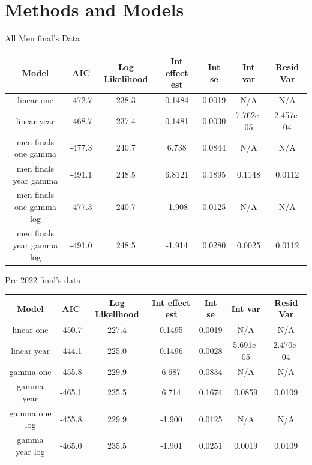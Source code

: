 \documentclass[12pt, letterpaper, titlepage]{article}
\begin{document}
\section{Methods and Models}
\label{sec:methods}


All Men final's Data
\begin{center}
  \begin{tabular}{|c | c | c | c | c | c | c |} 
   \hline\hline
   Model & AIC & Log Likelihood & Int effect est & Int se & Int var & Resid Var \\ [0.5ex] 
   \hline
   linear one & -472.7 & 238.3 & 0.1484 & 0.0019 & N/A & N/A \\ 
   \hline
   linear year & -468.7 & 237.4 & 0.1481 & 0.0030 & 7.762e-05 & 2.457e-04 \\
   \hline
   men finals one gamma & -477.3 & 240.7 & 6.738 & 0.0844 & N/A & N/A \\
   \hline
   men finals year gamma & -491.1 & 248.5 & 6.8121 & 0.1895 & 0.1148 & 0.0112 \\
   \hline
   men finals one gamma log & -477.3 & 240.7 & -1.908 & 0.0125 & N/A & N/A \\
   \hline
   men finals year gamma log & -491.0 & 248.5 & -1.914 & 0.0280 & 0.0025 & 0.0112 \\ [0.5ex]
   \hline
  \end{tabular}
\end{center}

Pre-2022 final's data
\begin{center}
  \begin{tabular}{|c | c | c | c | c | c | c |} 
   \hline\hline
   Model & AIC & Log Likelihood & Int effect est & Int se & Int var & Resid Var \\ [0.5ex] 
   \hline
   linear one & -450.7 & 227.4 & 0.1495 & 0.0019 & N/A & N/A \\
   \hline
   linear year & -444.1 & 225.0 & 0.1496 & 0.0028 & 5.691e-05 & 2.470e-04 \\ 
   \hline
   gamma one & -455.8 & 229.9 & 6.687 & 0.0834 & N/A & N/A \\
   \hline
   gamma year & -465.1 & 235.5 & 6.714 & 0.1674 & 0.0859 & 0.0109 \\
   \hline
   gamma one log & -455.8 & 229.9 & -1.900 & 0.0125 & N/A & N/A \\
   \hline
   gamma year log & -465.0 & 235.5 & -1.901 & 0.0251 & 0.0019 & 0.0109 \\ [0.5ex]
   \hline
  \end{tabular}
  \end{center}
\end{document}
